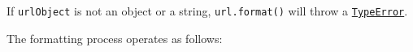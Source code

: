 \begin{Shaded}
\begin{Highlighting}[]
\OperatorTok{=} \NormalTok{(}\NormalTok{)}\OperatorTok{;}
\NormalTok{(\{}
  \OperatorTok{:} \OperatorTok{,}
  \OperatorTok{:} \OperatorTok{,}
  \OperatorTok{:} \OperatorTok{,}
  \OperatorTok{:}\NormalTok{ \{}
    \OperatorTok{:} \OperatorTok{,}
    \OperatorTok{:} \OperatorTok{,}
\NormalTok{  \}}\OperatorTok{,}
\NormalTok{\})}\OperatorTok{;}

\end{Highlighting}
\end{Shaded}

If \texttt{urlObject} is not an object or a string,
\texttt{url.format()} will throw a
\href{errors.md\#class-typeerror}{\texttt{TypeError}}.

The formatting process operates as follows:

